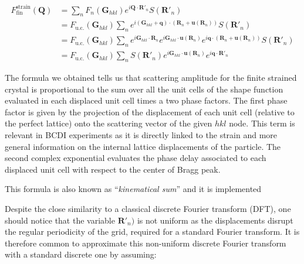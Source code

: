 \begin{equation}
    \begin{aligned}
        F^{\text{strain}}_{\text{fin}}(\mathbf{Q}) &= 
        \sum_{n} F_n(\mathbf{G}_{hkl}) e^{i \mathbf{Q} \cdot \mathbf{R}'_n} S(\mathbf{R}'_n) \\
        &= F_{\text{u.c.}}(\mathbf{G}_{hkl}) \sum_{n}  e^{i (\mathbf{G}_{hkl} + \mathbf{q}) \cdot  (\mathbf{R}_n + \mathbf{u}(\mathbf{R}_n)) } S(\mathbf{R}'_n) \\
        &= F_{\text{u.c.}}(\mathbf{G}_{hkl}) \sum_{n}  e^{i \mathbf{G}_{hkl}\cdot  \mathbf{R}_n} e^{i \mathbf{G}_{hkl} \cdot  \mathbf{u}(\mathbf{R}_n) } e^{i \mathbf{q} \cdot  (\mathbf{R}_n + \mathbf{u}(\mathbf{R}_n)) } S(\mathbf{R}'_n) \\
        &= F_{\text{u.c.}}(\mathbf{G}_{hkl}) \sum_{n} S(\mathbf{R}'_n) e^{i \mathbf{G}_{hkl} \cdot  \mathbf{u}(\mathbf{R}_n) } e^{i \mathbf{q} \cdot  \mathbf{R}'_n }
    \end{aligned}
    \label{eq:strain_fin4}
\end{equation}

The formula we obtained tells us that scattering amplitude for the finite strained crystal is proportional to the 
sum over all the unit cells of the shape function evaluated in each displaced unit cell times a two phase factors. 
The first phase factor is given by the projection of the displacement of each unit cell (relative to the perfect lattice) 
onto the scattering vector of the given $hkl$ node. This term is relevant in BCDI experiments as it is directly linked to 
the strain and more general information on the internal lattice displacements of the particle. 
The second complex exponential evaluates the phase delay associated to each displaced unit cell with respect to the 
center of Bragg peak. 

This formula is also known as ``\textit{kinematical sum}'' and it is implemented 

Despite the close similarity to a classical discrete Fourier transform (DFT), one should notice that the variable $\mathbf{R}'_n)$ 
is not uniform as the displacements disrupt the regular periodicity of the grid, required for a standard Fourier transform. 
It is therefore common to approximate this non-uniform discrete Fourier transform with a standard discrete one by assuming: 

